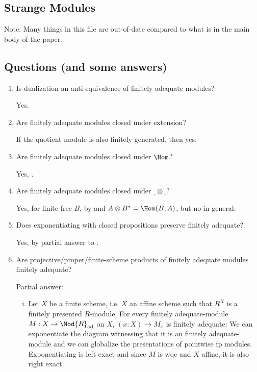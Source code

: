 \subsection{Strange Modules}\label{strange-modules}

Note:  Many things in this file are out-of-date compared to what is
in the main body of the paper.

\subsection{Questions (and some answers)}
\begin{enumerate}
\item Is dualization an anti-equivalence of finitely adequate modules?

      Yes.
\item Are finitely adequate modules closed under extension?

      If the quotient module is also finitely generated, then yes.
\item\label{ad-hom-closed} Are finitely adequate modules closed under $\Hom$?

      Yes, .
\item Are finitely adequate modules closed under $\_\otimes\_$?

      Yes, for finite free \(B\), by  and \(A\otimes B^\ast=\Hom(B,A)\), but no in general:


\item Does exponentiating with closed propositions preserve finitely adequate?

      Yes, by partial answer to .
\item\label{finite-exp-closed} Are projective/proper/finite-scheme products of finitely adequate modules finitely adequate?

      Partial answer:
      \begin{enumerate}[(i)]
      \item Let $X$ be a finite scheme, i.e. $X$ an affine scheme such that $R^X$ is a finitely presented $R$-module.
      For every finitely adequate-module $M:X\to\Mod{R}_{\mathrm{ad}}$ on $X$, $(x:X)\to M_x$ is finitely adequate: We can exponentiate the diagram witnessing that it is an finitely adequate-module and we can globalize the presentations of pointwise fp modules.
      Exponentiating is left exact and since $M$ is wqc and $X$ affine, it is also right exact.
      \end{enumerate}


\end{enumerate}
